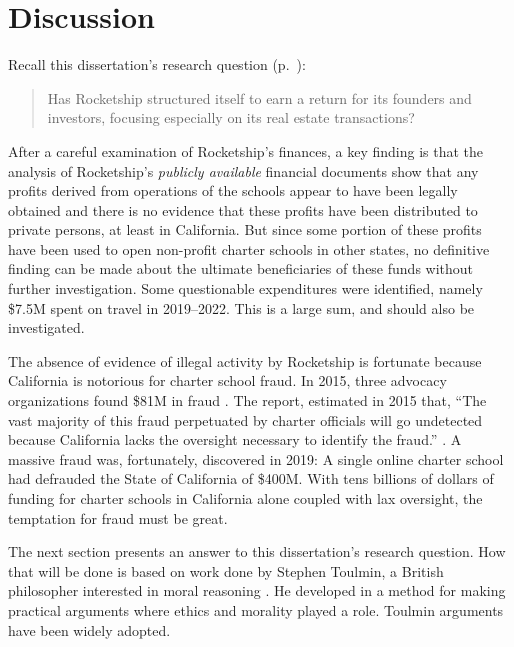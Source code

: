 
\chapter{Discussion}\label{ch:discussion}\indent%

Recall this dissertation's research question (p.~\pageref{sec:research-question}):
\begin{quote}
  Has Rocketship structured itself to earn a return for its founders and investors, focusing especially on its real estate transactions?
\end{quote}
After a careful examination of Rocketship's finances, a key finding is that the analysis of Rocketship's \textit{publicly available} financial documents show that any profits derived from operations of the schools appear to have been legally obtained and there is no evidence that these profits have been distributed to private persons, at least in California. But since some portion of these profits have been used to open non-profit charter schools in other states, no definitive finding can be made about the ultimate beneficiaries of these funds without further investigation. Some questionable expenditures were identified, namely \$7.5M spent on travel in 2019–2022. This is a large sum, and should also be investigated.

The absence of evidence of illegal activity by Rocketship is fortunate because California is notorious for charter school fraud. In 2015, three advocacy organizations found \$81M in fraud \citeauthor{CPD2015.etal}. The report,  estimated in 2015 that, ``The vast majority of this fraud perpetuated by charter officials will go undetected because California lacks the oversight necessary to identify the fraud.'' \parencite[2]{CPD2015.etal}. A massive fraud was, fortunately, discovered in 2019: A single online charter school had defrauded the State of California of \$400M. With tens billions of dollars of funding for charter schools in California alone coupled with lax oversight, the temptation for fraud must be great. 

The next section presents an answer to this dissertation's research question. How that will be done is based on work done by Stephen Toulmin, a British philosopher interested in moral reasoning \parencite{Toulmin2003}. He developed in  a method for making practical arguments where ethics and morality played a role. Toulmin arguments have been widely adopted. %

